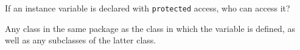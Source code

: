 If an instance variable is declared with {\tt protected} access, who can access it? \\
\begin{answer}
Any class in the same package as the class in which the variable is defined, as well as any subclasses of the latter class.
\end{answer}